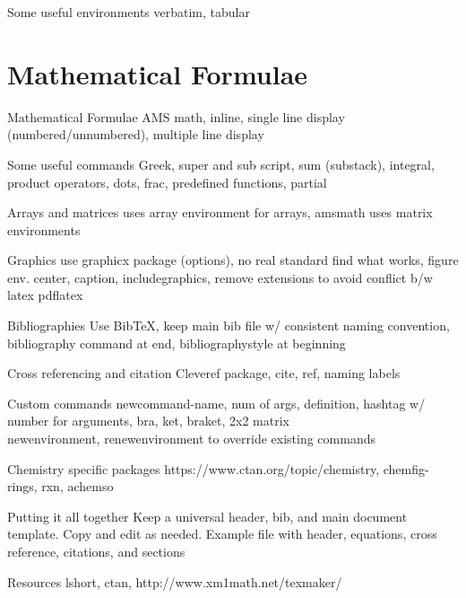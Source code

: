 \documentclass[11pt]{beamer}
\begin{document}
%
%
\begin{frame}{Some useful environments}
verbatim, tabular
\end{frame}

%
%
\section{Mathematical Formulae}
\begin{frame}{Mathematical Formulae}
AMS math, inline, single line display (numbered/unnumbered), multiple line display
\end{frame}

%
%
\begin{frame}{Some useful commands}
Greek, super and sub script, sum (substack), integral, product operators, dots, frac, predefined functions, partial
\end{frame}

%
%
\begin{frame}{Arrays and matrices}
uses array environment for arrays, amsmath uses matrix environments
\end{frame}

%
%
\begin{frame}{Graphics}
use graphicx package (options), no real standard find what works, figure env. center, caption, includegraphics, remove extensions to avoid conflict b/w latex pdflatex
\end{frame}

%
%
\begin{frame}{Bibliographies}
Use BibTeX, keep main bib file w/ consistent naming convention, bibliography command at end, bibliographystyle at beginning
\end{frame}

%
%
\begin{frame}{Cross referencing and citation}
Cleveref package, cite, ref, naming labels
\end{frame}

%
%
\begin{frame}{Custom commands}
newcommand-name, num of args, definition, hashtag w/ number for arguments, bra, ket, braket, 2x2 matrix \\
newenvironment, renewenvironment to override existing commands
\end{frame}

%
%
\begin{frame}{Chemistry specific packages}
https://www.ctan.org/topic/chemistry, chemfig-rings, rxn, achemso
\end{frame}

%
%
\begin{frame}{Putting it all together}
Keep a universal header, bib, and main document template. Copy and edit as needed. Example file with header, equations, cross reference, citations, and sections
\end{frame}

%
%
\begin{frame}{Resources}
lshort, ctan, http://www.xm1math.net/texmaker/
\end{frame}
\end{document}

